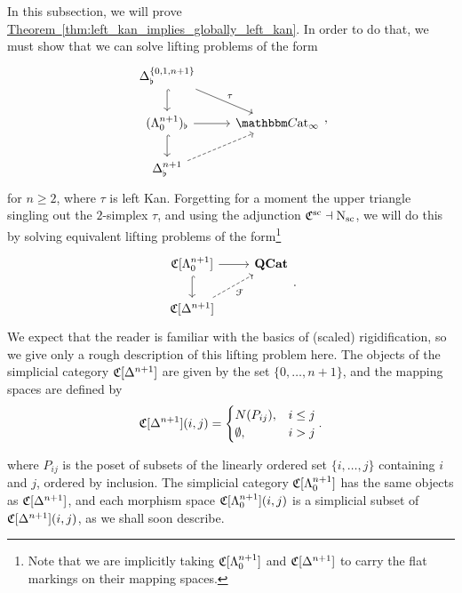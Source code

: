 \documentclass[main.tex]{subfiles}
\begin{document}
In this subsection, we will prove \hyperref[thm:left_kan_implies_globally_left_kan]{Theorem~\ref*{thm:left_kan_implies_globally_left_kan}}. In order to do that, we must show that we can solve lifting problems of the form
\begin{equation*}
  \label{eq:specific_left_horns_in_cat_infty_bicategories}
  \begin{tikzcd}
    \Delta^{\{0, 1, n+1\}}_{\flat}
    \arrow[d, hook]
    \arrow[dr, "\tau"]
    \\
    (\Lambda^{n+1}_{0})_{\flat}
    \arrow[r]
    \arrow[d, hook]
    & \ICCat
    \\
    \Delta^{n+1}_{\flat}
    \arrow[ur, dashed]
  \end{tikzcd},
\end{equation*}
for $n \geq 2$, where $\tau$ is left Kan. Forgetting for a moment the upper triangle singling out the $2$-simplex $\tau$, and using the adjunction $\mathfrak{C}^{\mathrm{sc}} \dashv \mathrm{N}_{\mathrm{sc}}$, we will do this by solving equivalent lifting problems of the form\footnote{Note that we are implicitly taking $\mathfrak{C}[\Lambda^{n+1}_{0}]$ and $\mathfrak{C}[\Delta^{n+1}]$ to carry the flat markings on their mapping spaces.}
\begin{equation}
  \label{eq:left_horns_in_cat_infty_scaled}
  \begin{tikzcd}
    \C[\Lambda^{n+1}_{0}]
    \arrow[r]
    \arrow[d, hook]
    & \QCat
    \\
    \C[\Delta^{n+1}]
    \arrow[ur, dashed, swap, "\mathcal{F}"]
  \end{tikzcd}.
\end{equation}
We expect that the reader is familiar with the basics of (scaled) rigidification, so we give only a rough description of this lifting problem here. The objects of the simplicial category $\mathfrak{C}[\Delta^{n+1}]$ are given by the set $\{0, \ldots, n+1\}$, and the mapping spaces are defined by
\begin{equation*}
  \mathfrak{C}[\Delta^{n+1}](i, j) =
  \begin{cases}
    N(P_{ij}), &i \leq j \\
    \emptyset, & i > j
  \end{cases}.
\end{equation*}

where $P_{ij}$ is the poset of subsets of the linearly ordered set $\{i, \ldots, j\}$ containing $i$ and $j$, ordered by inclusion. The simplicial category $\mathfrak{C}[\Lambda^{n+1}_{0}]$ has the same objects as $\mathfrak{C}[\Delta^{n+1}]$, and each morphism space $\mathfrak{C}[\Lambda^{n+1}_{0}](i, j)$ is a simplicial subset of $\mathfrak{C}[\Delta^{n+1}](i, j)$, as we shall soon describe.
\end{document}
